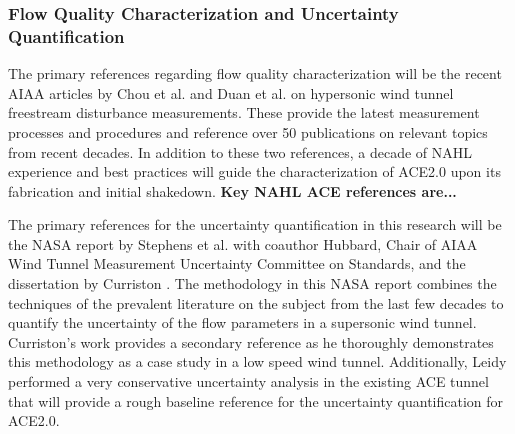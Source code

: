 \subsubsection{Flow Quality Characterization and Uncertainty Quantification}
The primary references regarding flow quality characterization will be the recent AIAA articles by Chou et al. \cite{chou} and Duan et al. \cite{duan} on hypersonic wind tunnel freestream disturbance measurements. These provide the latest measurement processes and procedures and reference over 50 publications on relevant topics from recent decades. In addition to these two references, a decade of NAHL experience and best practices will guide the characterization of ACE2.0 upon its fabrication and initial shakedown. \textbf{Key NAHL ACE references are...}

The primary references for the uncertainty quantification in this research will be the NASA report by Stephens et al. \cite{stephens-hubbard} with coauthor Hubbard, Chair of AIAA Wind Tunnel Measurement Uncertainty Committee on Standards, and the dissertation by Curriston \cite{curriston}. The methodology in this NASA report combines the techniques of the prevalent literature on the subject from the last few decades to quantify the uncertainty of the flow parameters in a supersonic wind tunnel. Curriston's work provides a secondary reference as he thoroughly demonstrates this methodology as a case study in a low speed wind tunnel. Additionally, Leidy \cite{leidy-dis} performed a very conservative uncertainty analysis in the existing ACE tunnel that will provide a rough baseline reference for the uncertainty quantification for ACE2.0. 

